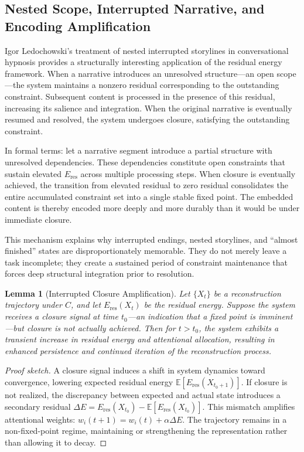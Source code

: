 \documentclass[12pt, letterpaper]{article}
\theoremstyle{flyxion}
\newtheorem{lemma}[theorem]{Lemma}
\begin{document}
\subsection{Nested Scope, Interrupted Narrative, and Encoding Amplification}

Igor Ledochowski's treatment of nested interrupted storylines in conversational hypnosis provides a structurally interesting application of the residual energy framework. When a narrative introduces an unresolved structure---an open scope---the system maintains a nonzero residual corresponding to the outstanding constraint. Subsequent content is processed in the presence of this residual, increasing its salience and integration. When the original narrative is eventually resumed and resolved, the system undergoes closure, satisfying the outstanding constraint.

In formal terms: let a narrative segment introduce a partial structure with unresolved dependencies. These dependencies constitute open constraints that sustain elevated $E_\mathrm{res}$ across multiple processing steps. When closure is eventually achieved, the transition from elevated residual to zero residual consolidates the entire accumulated constraint set into a single stable fixed point. The embedded content is thereby encoded more deeply and more durably than it would be under immediate closure.

This mechanism explains why interrupted endings, nested storylines, and ``almost finished'' states are disproportionately memorable. They do not merely leave a task incomplete; they create a sustained period of constraint maintenance that forces deep structural integration prior to resolution.

\begin{lemma}[Interrupted Closure Amplification]
Let $\{X_t\}$ be a reconstruction trajectory under $C$, and let $E_\mathrm{res}(X_t)$ be the residual energy. Suppose the system receives a closure signal at time $t_0$---an indication that a fixed point is imminent---but closure is not actually achieved. Then for $t > t_0$, the system exhibits a transient increase in residual energy and attentional allocation, resulting in enhanced persistence and continued iteration of the reconstruction process.
\end{lemma}

\begin{proof}[Proof sketch]
A closure signal induces a shift in system dynamics toward convergence, lowering expected residual energy $\mathbb{E}[E_\mathrm{res}(X_{t_0+1})]$. If closure is not realized, the discrepancy between expected and actual state introduces a secondary residual $\Delta E = E_\mathrm{res}(X_{t_0}) - \mathbb{E}[E_\mathrm{res}(X_{t_0})]$. This mismatch amplifies attentional weights: $w_i(t+1) = w_i(t) + \alpha \Delta E$. The trajectory remains in a non-fixed-point regime, maintaining or strengthening the representation rather than allowing it to decay.
\end{proof}
\end{document}
